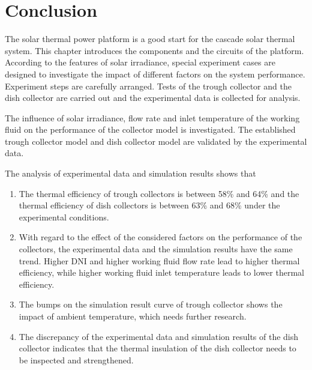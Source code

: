 \section{Conclusion}

The solar thermal power platform is a good start for the cascade solar thermal system. This chapter introduces the components and the circuits of the platform. According to the features of solar irradiance, special experiment cases are designed to investigate the impact of different factors on the system performance. Experiment steps are carefully arranged.
Tests of the trough collector and the dish collector are carried out and the experimental data is collected for analysis. 

The influence of solar irradiance, flow rate and inlet temperature of the working fluid on the performance of the collector model is investigated. The established trough collector model and dish collector model are validated by the experimental data.

The analysis of experimental data and simulation results shows that

\begin{enumerate}[label=(\arabic*)]
\item The thermal efficiency of trough collectors is between 58\% and 64\% and the thermal efficiency of dish collectors is between 63\% and 68\% under the experimental conditions.
\item With regard to the effect of the considered factors on the performance of the collectors, the experimental data and the simulation results have the same trend. Higher DNI and higher working fluid flow rate lead to higher thermal efficiency, while higher working fluid inlet temperature leads to lower thermal efficiency.
\item The bumps on the simulation result curve of trough collector shows the impact of ambient temperature, which needs further research.
\item The discrepancy of the experimental data and simulation results of the dish collector indicates that the thermal insulation of the dish collector needs to be inspected and strengthened.
\end{enumerate}